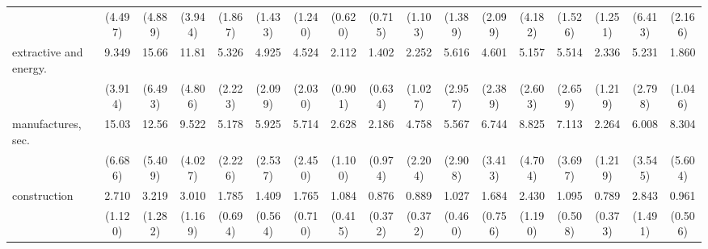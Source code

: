 {\begin{tabular}{l*{16}{c}}
                    &     (4.497)         &     (4.889)         &     (3.944)         &     (1.867)         &     (1.433)         &     (1.240)         &     (0.620)         &     (0.715)         &     (1.103)         &     (1.389)         &     (2.099)         &     (4.182)         &     (1.526)         &     (1.251)         &     (6.413)         &     (2.166)         \\
[1em]
extractive and energy.&       9.349\sym{***}&       15.66\sym{***}&       11.81\sym{***}&       5.326\sym{***}&       4.925\sym{***}&       4.524\sym{***}&       2.112         &       1.402         &       2.252         &       5.616\sym{**} &       4.601\sym{**} &       5.157\sym{**} &       5.514\sym{***}&       2.336         &       5.231\sym{**} &       1.860         \\
                    &     (3.914)         &     (6.493)         &     (4.806)         &     (2.223)         &     (2.099)         &     (2.030)         &     (0.901)         &     (0.634)         &     (1.027)         &     (2.957)         &     (2.389)         &     (2.603)         &     (2.659)         &     (1.219)         &     (2.798)         &     (1.046)         \\
[1em]
manufactures, sec.  &       15.03\sym{***}&       12.56\sym{***}&       9.522\sym{***}&       5.178\sym{***}&       5.925\sym{***}&       5.714\sym{***}&       2.628\sym{*}  &       2.186         &       4.758\sym{***}&       5.567\sym{**} &       6.744\sym{***}&       8.825\sym{***}&       7.113\sym{***}&       2.264         &       6.008\sym{**} &       8.304\sym{**} \\
                    &     (6.686)         &     (5.409)         &     (4.027)         &     (2.226)         &     (2.537)         &     (2.450)         &     (1.100)         &     (0.974)         &     (2.204)         &     (2.908)         &     (3.413)         &     (4.704)         &     (3.697)         &     (1.219)         &     (3.545)         &     (5.604)         \\
[1em]
construction        &       2.710\sym{*}  &       3.219\sym{**} &       3.010\sym{**} &       1.785         &       1.409         &       1.765         &       1.084         &       0.876         &       0.889         &       1.027         &       1.684         &       2.430         &       1.095         &       0.789         &       2.843\sym{*}  &       0.961         \\
                    &     (1.120)         &     (1.282)         &     (1.169)         &     (0.694)         &     (0.564)         &     (0.710)         &     (0.415)         &     (0.372)         &     (0.372)         &     (0.460)         &     (0.756)         &     (1.190)         &     (0.508)         &     (0.373)         &     (1.491)         &     (0.506)         \\

\end{tabular}}
